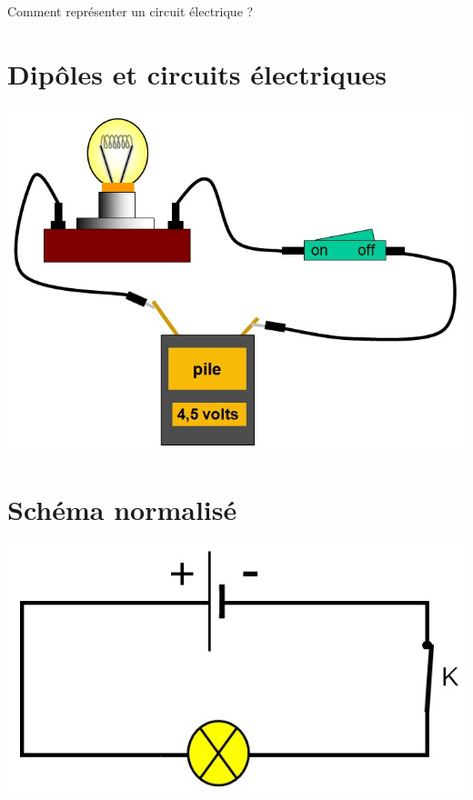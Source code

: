 \documentclass[12pt,a4paper]{article}
\date{}
\title{}
\begin{document}
	
	




\begin{mypb}
	Comment représenter un circuit électrique ?
\end{mypb}


\section{Dipôles et circuits électriques}





\begin{center}
	\includegraphics[scale=0.35]{img/circuitsimple}
\end{center}


\section{Schéma normalisé}




\begin{center}
	\includegraphics[scale=0.5]{img/schema}
\end{center}
\end{document}
